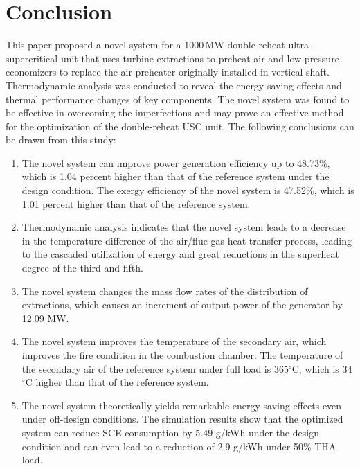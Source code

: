 \documentclass[preprint,12pt]{elsarticle}
\begin{document}

\section{Conclusion}
This paper proposed a novel system for a 1000\,MW double-reheat ultra-supercritical unit that uses turbine extractions to preheat air and low-pressure economizers to replace the air preheater originally installed in vertical shaft.
Thermodynamic analysis was conducted to reveal the energy-saving effects and thermal performance changes of key components. 
The novel system was found to be effective in overcoming the imperfections
and may prove an effective method for the optimization of the double-reheat USC unit.
The following conclusions can be drawn from this study: 
 \begin{enumerate}[(1)]
 \item The novel system can improve power generation efficiency up to 48.73\%, which is 1.04 percent higher than that of the reference system under the design condition. The exergy efficiency of the novel system is 47.52\%, which is 1.01 percent higher than that of the reference system.
 \item Thermodynamic analysis indicates that the novel system leads to a decrease in the temperature difference of the air/flue-gas heat transfer process, leading to the cascaded utilization of energy and great reductions in the superheat degree of the third and fifth.
\item The novel system changes the mass flow rates of the distribution of extractions, which causes an increment of output power of the generator by 12.09 MW. %
\item The novel system improves the temperature of the secondary air, which improves the fire condition in the combustion chamber.
 The temperature of the secondary air of the reference system under full load is 365$^\circ$C, which is 34$^\circ$C higher than that of the reference system.
\item The novel system theoretically yields remarkable energy-saving effects even under off-design conditions. The simulation results show that the optimized system can reduce SCE consumption by 5.49 g/kWh under the design condition and can even lead to a reduction of 2.9 g/kWh under 50\% THA load.
\end{enumerate}
\end{document}
